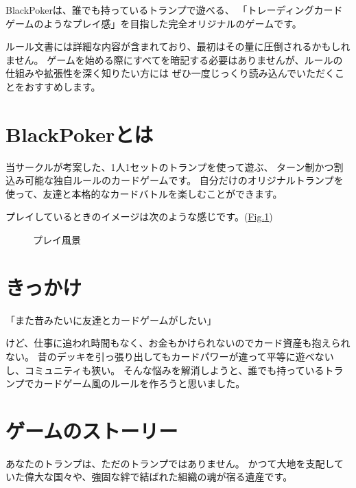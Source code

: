 \documentclass[letterpaper,10pt,dvipdfmx]{sphinxmanual}
\begin{document}
\sphinxAtStartPar
BlackPokerは、誰でも持っているトランプで遊べる、
「トレーディングカードゲームのようなプレイ感」を目指した完全オリジナルのゲームです。

\sphinxAtStartPar
ルール文書には詳細な内容が含まれており、最初はその量に圧倒されるかもしれません。
ゲームを始める際にすべてを暗記する必要はありませんが、ルールの仕組みや拡張性を深く知りたい方には
ぜひ一度じっくり読み込んでいただくことをおすすめします。


\section{BlackPokerとは}
\label{\detokenize{init/init:blackpoker}}
\sphinxAtStartPar
当サークルが考案した、1人1セットのトランプを使って遊ぶ、
ターン制かつ割込み可能な独自ルールのカードゲームです。
自分だけのオリジナルトランプを使って、友達と本格的なカードバトルを楽しむことができます。

\sphinxAtStartPar
プレイしているときのイメージは次のような感じです。(\hyperref[\detokenize{init/init:play-image}]{Fig.\@ \ref{\detokenize{init/init:play-image}}})

\begin{figure}[htbp]
\centering
\capstart

\noindent{}
\caption{プレイ風景}\label{\detokenize{init/init:id7}}\label{\detokenize{init/init:play-image}}\end{figure}


\section{きっかけ}
\label{\detokenize{init/init:id2}}
\begin{sphinxVerbatim}[commandchars=\\\{\}]
「また昔みたいに友達とカードゲームがしたい」
\end{sphinxVerbatim}

\sphinxAtStartPar
けど、仕事に追われ時間もなく、お金もかけられないのでカード資産も抱えられない。
昔のデッキを引っ張り出してもカードパワーが違って平等に遊べないし、コミュニティも狭い。
そんな悩みを解消しようと、誰でも持っているトランプでカードゲーム風のルールを作ろうと思いました。


\section{ゲームのストーリー}
\label{\detokenize{init/init:id3}}
\sphinxAtStartPar
あなたのトランプは、ただのトランプではありません。
かつて大地を支配していた偉大な国々や、強固な絆で結ばれた組織の魂が宿る遺産です。
\end{document}

